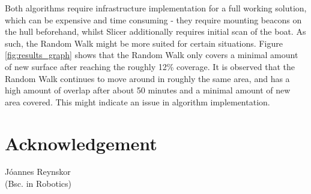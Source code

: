Both algorithms require infrastructure implementation for a full working solution, which can be expensive and time consuming - they require mounting beacons on the hull beforehand, whilst Slicer additionally requires initial scan of the boat.
As such, the Random Walk might be more suited for certain situations. Figure \ref{fig:results_graph} shows that the Random Walk only covers a minimal amount of new surface after reaching the roughly 12\% coverage. It is observed that the Random Walk continues to move around in roughly the same area, and has a high amount of overlap after about 50 minutes and a minimal amount of new area covered. This might indicate an issue in algorithm implementation. 



\section*{Acknowledgement}
\begin{center}
    Jóannes Reynskor\\
    (Bsc. in Robotics)
\end{center}
    

